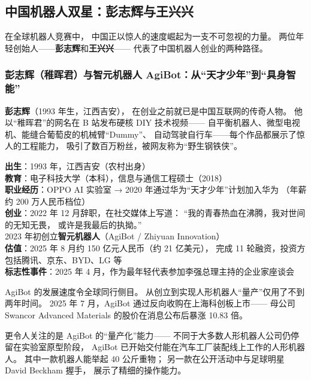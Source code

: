 \subsection{中国机器人双星：彭志辉与王兴兴}
\label{subsec:china-robotics}

在全球机器人竞赛中，
中国正以惊人的速度崛起为一支不可忽视的力量。
两位年轻创始人——\textbf{彭志辉}和\textbf{王兴兴}——
代表了中国机器人创业的两种路径。

\subsubsection{彭志辉（稚晖君）与智元机器人 AgiBot：从``天才少年''到``具身智能''}

\textbf{彭志辉}（1993 年生，江西吉安），
在创业之前就已是中国互联网的传奇人物。
他以``稚晖君''的网名在 B 站发布硬核 DIY 技术视频——
自平衡机器人、微型电视机、能缝合葡萄皮的机械臂``Dummy''、
自动驾驶自行车——每个作品都展示了惊人的工程能力，
吸引了数百万粉丝，被网友称为``野生钢铁侠''。

\begin{corebox}
\textbf{出生}：1993 年，江西吉安（农村出身）\\
\textbf{教育}：电子科技大学（本科），信息与通信工程硕士（2018）\\
\textbf{职业经历}：OPPO AI 实验室 → 2020 年通过华为``天才少年''计划加入华为
（年薪约 200 万人民币档位）\\
\textbf{创业}：2022 年 12 月辞职，在社交媒体上写道：
``我的青春热血在沸腾，我对世间的无知无畏，
或许是我最后的执拗。''\\
2023 年初创立\textbf{智元机器人}（AgiBot / Zhiyuan Innovation）\\
\textbf{估值}：2025 年 8 月约 150 亿元人民币（约 21 亿美元），
完成 11 轮融资，投资方包括腾讯、京东、BYD、LG 等\\
\textbf{标志性事件}：2025 年 4 月，作为最年轻代表参加李强总理主持的企业家座谈会
\end{corebox}

AgiBot 的发展速度令全球同行侧目。
从创立到实现人形机器人``量产''仅用了不到两年时间。
2025 年 7 月，AgiBot 通过反向收购在上海科创板上市——
母公司 Swancor Advanced Materials 的股价在消息公布后暴涨 10.83 倍。

更令人关注的是 AgiBot 的``量产化''能力——
不同于大多数人形机器人公司仍停留在实验室原型阶段，
AgiBot 已开始交付能在汽车工厂装配线上工作的人形机器人。
其中一款机器人能举起 40 公斤重物；
另一款在公开活动中与足球明星 David Beckham 握手，
展示了精细的操作能力。

